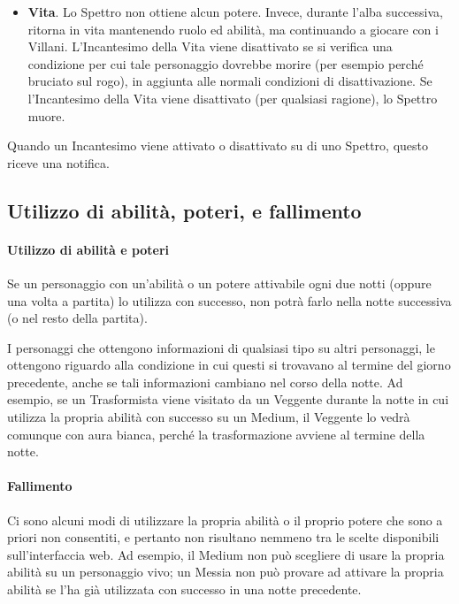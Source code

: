 \documentclass[a4paper,10pt]{article}
\begin{document}
\begin{itemize}
	\item {\bf Vita}. Lo Spettro non ottiene alcun potere. Invece, durante l'alba successiva, ritorna in vita mantenendo ruolo ed abilità, ma continuando a giocare con i Villani. L'Incantesimo della Vita viene disattivato se si verifica una condizione per cui tale personaggio dovrebbe morire (per esempio perché bruciato sul rogo), in aggiunta alle normali condizioni di disattivazione. Se l'Incantesimo della Vita viene disattivato (per qualsiasi ragione), lo Spettro muore.
 
\end{itemize}

Quando un Incantesimo viene attivato o disattivato su di uno Spettro, questo riceve una notifica.

\subsection{Utilizzo di abilità, poteri, e fallimento}
\label{fallimento}

\paragraph{Utilizzo di abilità e poteri} 

Se un personaggio con un'abilità o un potere attivabile ogni due notti (oppure una volta a partita) lo utilizza con successo, non potrà farlo nella notte successiva (o nel resto della partita).

I personaggi che ottengono informazioni di qualsiasi tipo su altri personaggi, le ottengono riguardo alla condizione in cui questi si trovavano al termine del giorno precedente, anche se tali informazioni cambiano nel corso della notte.
Ad esempio, se un Trasformista viene visitato da un Veggente durante la notte in cui utilizza la propria abilità con successo su un Medium, il Veggente lo vedrà comunque con aura bianca, perché la trasformazione avviene al termine della notte.

\paragraph{Fallimento} Ci sono alcuni modi di utilizzare la propria abilità o il proprio potere che sono a priori non consentiti, e pertanto non risultano nemmeno tra le scelte disponibili sull'interfaccia web. Ad esempio, il Medium non può scegliere di usare la propria abilità su un personaggio vivo; un Messia non può provare ad attivare la propria abilità se l'ha già utilizzata con successo in una notte precedente.
\end{document}
